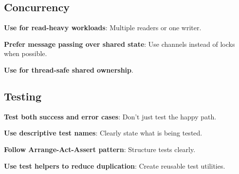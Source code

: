 \subsection{Concurrency}
\label{subsec:ch24-best-concurrent}

\textbf{Use  for read-heavy workloads}: Multiple readers or one writer.

\textbf{Prefer message passing over shared state}: Use channels instead of locks when possible.

\textbf{Use  for thread-safe shared ownership}.

\subsection{Testing}
\label{subsec:ch24-best-test}

\textbf{Test both success and error cases}: Don't just test the happy path.

\textbf{Use descriptive test names}: Clearly state what is being tested.

\textbf{Follow Arrange-Act-Assert pattern}: Structure tests clearly.

\textbf{Use test helpers to reduce duplication}: Create reusable test utilities.


